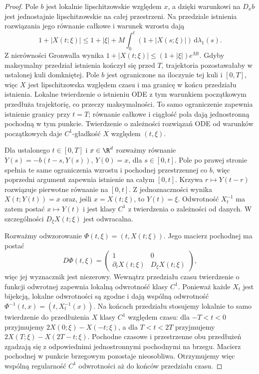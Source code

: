 \begin{proof}
Pole $b$ jest lokalnie lipschitzowskie względem $x$,
a dzięki warunkowi na $D_xb$ jest jednostajnie
lipschitzowskie na całej przestrzeni. Na przedziale istnienia rozwiązania jego równanie
całkowe i warunek wzrostu dają
\[
 1+|X(t;\xi)|\le 1+|\xi|
 +M\int_0^t(1+|X(s;\xi)|)\,\mathrm d\lambda_1(s).
\]
Z nierówności Gronwalla wynika
$1+|X(t;\xi)|\le(1+|\xi|)e^{Mt}$.
Gdyby maksymalny przedział istnienia kończył się przed $T$,
trajektoria pozostawałaby w ustalonej kuli domkniętej.
Pole $b$ jest ograniczone na iloczynie tej kuli i $[0,T]$,
więc $X$ jest lipschitzowska względem czasu i ma granicę
w końcu przedziału istnienia. Lokalne twierdzenie o istnieniu
ODE z tym warunkiem początkowym przedłuża trajektorię,
co przeczy maksymalności. To samo ograniczenie zapewnia
istnienie granicy przy $t=T$; równanie całkowe i ciągłość
pola dają jednostronną pochodną w tym punkcie. Twierdzenie o zależności rozwiązań
ODE od warunków początkowych daje $C^1$-gładkość $X$
względem $(t,\xi)$.

Dla ustalonego $t\in[0,T]$ i $x\in\R^d$ rozważmy
równanie $\dot Y(s)=-b(t-s,Y(s))$, $Y(0)=x$,
dla $s\in[0,t]$. Pole po prawej stronie spełnia te same
ograniczenia wzrostu i pochodnej przestrzennej co $b$,
więc poprzedni argument zapewnia istnienie na całym
$[0,t]$. Krzywa $r\mapsto Y(t-r)$ rozwiązuje pierwotne
równanie na $[0,t]$. Z jednoznaczności wynika
$X(t;Y(t))=x$ oraz, jeśli $x=X(t;\xi)$, to $Y(t)=\xi$.
Odwrotność $X_t^{-1}$ ma zatem postać $x\mapsto Y(t)$
i jest klasy $C^1$ z twierdzenia o zależności od danych.
W szczególności $D_\xi X(t;\xi)$ jest odwracalna.

Rozważmy odwzorowanie $\Phi(t,\xi)=(t,X(t;\xi))$.
Jego macierz pochodnej ma postać
\[
 D\Phi(t,\xi)=
 \begin{pmatrix}1&0\\ \partial_t X(t;\xi)&D_\xi X(t;\xi)\end{pmatrix},
\]
więc jej wyznacznik jest niezerowy.
Wewnątrz przedziału czasu twierdzenie o funkcji odwrotnej
zapewnia lokalną odwrotność klasy $C^1$. Ponieważ każde $X_t$
jest bijekcją, lokalne odwrotności są zgodne i dają wspólną
odwrotność $\Phi^{-1}(t,x)=(t,X_t^{-1}(x))$.
Na końcach przedziału stosujemy lokalnie to samo twierdzenie
do przedłużenia $X$ klasy $C^1$ względem czasu:
dla $-T<t<0$ przyjmujemy $2X(0;\xi)-X(-t;\xi)$,
a dla $T<t<2T$ przyjmujemy $2X(T;\xi)-X(2T-t;\xi)$.
Pochodne czasowe i przestrzenne obu przedłużeń zgadzają się
z odpowiednimi jednostronnymi pochodnymi na brzegu.
Macierz pochodnej w punkcie brzegowym pozostaje
nieosobliwa. Otrzymujemy więc wspólną regularność $C^1$
odwrotności aż do końców przedziału czasu.


\end{proof}
